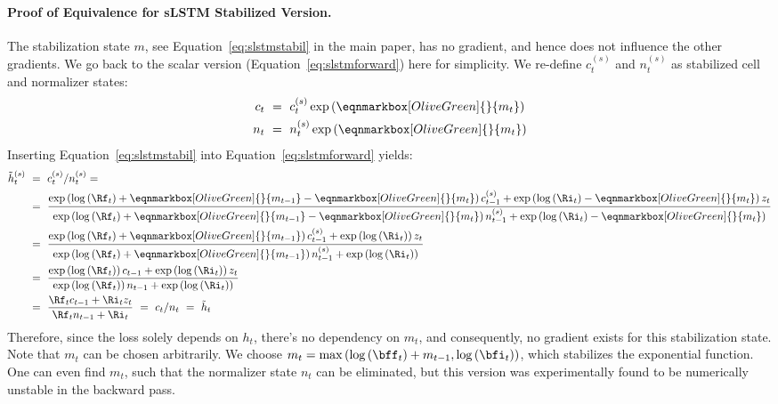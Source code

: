 \documentclass[dvipsnames]{article}
\newcommand{\cellstate}[1]{\eqnmarkbox[OliveGreen]{}{#1}}
\begin{document}
\begin{appendix}
\paragraph{Proof of Equivalence for sLSTM Stabilized Version.} The stabilization state $m$, see Equation~\eqref{eq:slstmstabil} in the main paper, has no gradient, and hence does not influence the other gradients. We go back to the scalar version (Equation~\ref{eq:slstmforward}) here for simplicity. We re-define $c^{(s)}_t$ and $n^{(s)}_t$ as stabilized cell and normalizer states:
	\begin{align}
		c_t \ &= \ c^{(s)}_t \exp \left(\cellstate{ m_t }\right)	 \\
		n_t \ &= \ n^{(s)}_t \exp \left(\cellstate{m_t} \right)
	\end{align}
	Inserting Equation~\ref{eq:slstmstabil} into Equation~\ref{eq:slstmforward} yields:
	\begin{align}
		\tilde{h}^{(s)}_t \ &= \ c^{(s)}_t / n^{(s)}_t =
        \\
		&= \ \frac{ \exp \left( \log \left( \Rf_t \right) + \cellstate{m_{t-1}} - \cellstate{m_t} \right) c^{(s)}_{t-1} + \exp \left( \log \left ( \Ri_t \right) - \cellstate{m_t} \right) z_t }{\exp \left( \log \left( \Rf_t \right) + \cellstate{m_{t-1}} - \cellstate{m_t} \right) n^{(s)}_{t-1} + \exp \left( \log \left( \Ri_t \right) - \cellstate{m_t} \right) }
  \\
		&= \ \frac{ \exp \left( \log \left( \Rf_t \right) + \cellstate{m_{t-1}}  \right) c^{(s)}_{t-1} + \exp \left( \log \left( \Ri_t \right) \right) z_t }{\exp \left( \log \left( \Rf_t \right) + \cellstate{m_{t-1}}  \right) n^{(s)}_{t-1} + \exp \left( \log \left( \Ri_t \right) \right) }
  \\
		&= \ \frac{ \exp \left( \log \left( \Rf_t \right)  \right) c_{t-1} + \exp \left( \log \left( \Ri_t \right) \right) z_t }{\exp \left( \log \left( \Rf_t \right)  \right) n_{t-1} + \exp \left( \log \left( \Ri_t \right) \right) }
  \\
		&= \ \frac{ \Rf_t c_{t-1} + \Ri_t z_t }{ \Rf_t  n_{t-1} +  \Ri_t } \ = \ c_t / n_t \ = \ \tilde{h}_t
	\end{align}
Therefore, since the loss solely depends on $h_t$, there's no dependency on $m_t$, and consequently, no gradient exists for this stabilization state.
Note that $m_t$ can be chosen arbitrarily. We choose $m_t = \max \left( \log \left( \bff_t \right) + m_{t-1}, \log \left( \bfi_t \right) \right) $, which stabilizes the exponential function. One can even find $m_t$, such that the normalizer state $n_t$ can be eliminated, but this version was experimentally found to be numerically unstable in the backward pass.

\end{appendix}
\end{document}
